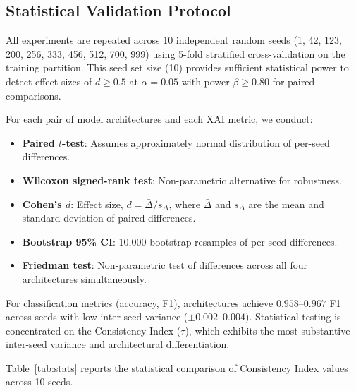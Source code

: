 \documentclass[conference]{IEEEtran}
\begin{document}
\subsection{Statistical Validation Protocol}

All experiments are repeated across 10 independent random seeds (1, 42, 123, 200, 256, 333, 456, 512, 700, 999) using 5-fold stratified cross-validation on the training partition. This seed set size (10) provides sufficient statistical power to detect effect sizes of $d \geq 0.5$ at $\alpha = 0.05$ with power $\beta \geq 0.80$ for paired comparisons.

For each pair of model architectures and each XAI metric, we conduct:
\begin{itemize}
  \item \textbf{Paired $t$-test}: Assumes approximately normal distribution of per-seed differences.
  \item \textbf{Wilcoxon signed-rank test}: Non-parametric alternative for robustness.
  \item \textbf{Cohen's $d$}: Effect size, $d = \bar{\Delta}/s_\Delta$, where $\bar{\Delta}$ and $s_\Delta$ are the mean and standard deviation of paired differences.
  \item \textbf{Bootstrap 95\% CI}: 10,000 bootstrap resamples of per-seed differences.
  \item \textbf{Friedman test}: Non-parametric test of differences across all four architectures simultaneously.
\end{itemize}

For classification metrics (accuracy, F1), architectures achieve $0.958$--$0.967$ F1 across seeds with low inter-seed variance ($\pm 0.002$--$0.004$). Statistical testing is concentrated on the Consistency Index ($\tau$), which exhibits the most substantive inter-seed variance and architectural differentiation.

Table~\ref{tab:stats} reports the statistical comparison of Consistency Index values across 10 seeds.
\end{document}
